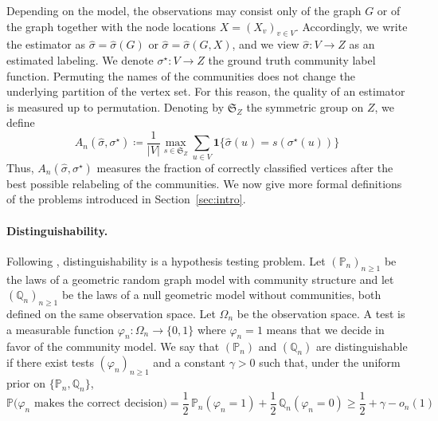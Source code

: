 \documentclass[runningheads]{llncs}
\begin{document}
Depending on the model, the observations may consist only of the graph \(G\) or of the graph together with the node locations \(X=(X_v)_{v\in V}\). 
Accordingly, we write the estimator as \(\hat{\sigma}=\hat{\sigma}(G)\) or \(\hat{\sigma}=\hat{\sigma}(G,X)\), and we view \(\hat{\sigma}:V\to Z\) as an estimated labeling.  We denote \(\sigma^\star:V\to Z\) the ground truth community label function.
Permuting the names of the communities does not change the underlying partition of the vertex set. For this reason, the quality of an estimator is measured up to permutation. Denoting by \(\mathfrak{S}_Z\) the symmetric group on \(Z\), we define
\[
A_n(\hat{\sigma},\sigma^\star)
\coloneqq \frac{1}{|V|}
\max_{s \in \mathfrak{S}_Z}
\sum_{u\in V}
\mathbf{1}\bigl\{\hat{\sigma}(u)=s(\sigma^\star(u))\bigr\}
\]
Thus, \(A_n(\hat{\sigma},\sigma^\star)\) measures the fraction of correctly classified vertices after the best possible relabeling of the communities. 
We now give more formal definitions of the problems introduced in Section~\ref{sec:intro}.
\paragraph{Distinguishability.}
Following \citep{sankararaman2018community}, distinguishability is a hypothesis testing problem.
Let \((\mathbb P_n)_{n\ge 1}\) be the laws of a geometric random graph model with community structure and let \((\mathbb Q_n)_{n\ge 1}\) be the laws of a null geometric model without communities, both defined
on the same observation space. Let \(\Omega_n\) be the observation space. A test is a measurable function \(\varphi_n: \Omega_n \to\{0,1\}\) where \(\varphi_n=1\) means that we decide in favor of the community model.
We say that \((\mathbb P_n)\) and \((\mathbb Q_n)\) are distinguishable if there exist tests
\((\varphi_n)_{n\ge 1}\) and a constant \(\gamma>0\) such that, under the uniform prior on
\(\{\mathbb P_n,\mathbb Q_n\}\),
\[
\mathbb P\big(\text{\(\varphi_n\) makes the correct decision}\big)
= \frac12\,\mathbb P_n(\varphi_n=1)+\frac12\,\mathbb Q_n(\varphi_n=0)
\ge \frac12+\gamma-o_n(1)
\]
\end{document}
